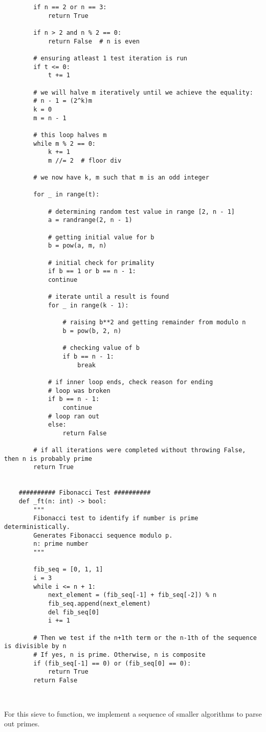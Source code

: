 \documentclass[11pt]{article}
\begin{document}
\begin{lstlisting}
		if n == 2 or n == 3:
			return True
		
		if n > 2 and n % 2 == 0:
			return False  # n is even
		
		# ensuring atleast 1 test iteration is run
		if t <= 0:
			t += 1
		
		# we will halve m iteratively until we achieve the equality:
		# n - 1 = (2^k)m
		k = 0
		m = n - 1
		
		# this loop halves m
		while m % 2 == 0:
			k += 1
			m //= 2  # floor div
		
		# we now have k, m such that m is an odd integer
		
		for _ in range(t):
		
			# determining random test value in range [2, n - 1]
			a = randrange(2, n - 1)
			
			# getting initial value for b
			b = pow(a, m, n)
			
			# initial check for primality
			if b == 1 or b == n - 1:
			continue
			
			# iterate until a result is found
			for _ in range(k - 1):
			
				# raising b**2 and getting remainder from modulo n
				b = pow(b, 2, n)
				
				# checking value of b
				if b == n - 1:
					break
			
			# if inner loop ends, check reason for ending
			# loop was broken
			if b == n - 1:
				continue
			# loop ran out
			else:
				return False
		
		# if all iterations were completed without throwing False, then n is probably prime
		return True
	
	
	########## Fibonacci Test ##########
	def _ft(n: int) -> bool:
		"""
		Fibonacci test to identify if number is prime deterministically.
		Generates Fibonacci sequence modulo p.
		n: prime number
		"""
		
		fib_seq = [0, 1, 1]
		i = 3
		while i <= n + 1:
			next_element = (fib_seq[-1] + fib_seq[-2]) % n
			fib_seq.append(next_element)
			del fib_seq[0]
			i += 1
		
		# Then we test if the n+1th term or the n-1th of the sequence is divisible by n
		# If yes, n is prime. Otherwise, n is composite
		if (fib_seq[-1] == 0) or (fib_seq[0] == 0):
			return True
		return False
	
		
\end{lstlisting}

For this sieve to function, we implement a sequence of smaller algorithms to parse out primes.
\end{document}
